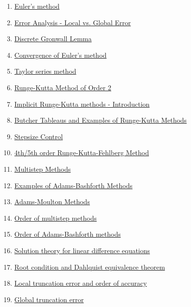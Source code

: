 \documentclass[11pt]{article}
\begin{document}
\begin{enumerate}
	\item \href{https://mp.weixin.qq.com/s/kYF-Ceohfhhii9OZVoskRQ}{Euler's method}	%
	\item \href{https://mp.weixin.qq.com/s/NOlZQwAl7e28JQ4aR_zigg}{Error Analysis - Local vs. Global Error}	%
	\item \href{https://mp.weixin.qq.com/s/ldqy32nC6bWUUHdd9i_ykA}{Discrete Gronwall Lemma}	%
	\item \href{https://mp.weixin.qq.com/s/iCCQx7UkC992DXQa-XiBig}{Convergence of Euler's method}	%
	\item \href{https://mp.weixin.qq.com/s/E7tK_shf3mFskTIXi7Zg2w}{Taylor series method}	%
	\item \href{https://mp.weixin.qq.com/s/g-EztkOwAAf5kmZgO2INfw}{Runge-Kutta Method of Order 2}	%
	\item \href{https://mp.weixin.qq.com/s/1s8sd0VurrrkHNtOFeu2wA}{Implicit Runge-Kutta methods - Introduction}	%
	\item \href{https://mp.weixin.qq.com/s/51UG3JpMITQzV94fJ4AFJg}{Butcher Tableaus and Examples of Runge-Kutta Methods}	%
	\item \href{https://mp.weixin.qq.com/s/FhHv6yyWZLPv2joYe6CUFQ}{Stepsize Control}	%
	\item \href{https://mp.weixin.qq.com/s/fpSfs0N2BFNOJwawb7AK0g}{4th/5th order Runge-Kutta-Fehlberg Method}	%
	\item \href{https://mp.weixin.qq.com/s/xSNMBn_vFWct-2rO4FJmbw}{Multistep Methods}	%
	\item \href{https://mp.weixin.qq.com/s/IXb1LbYIDzlEGEY0xV21rg}{Examples of Adams-Bashforth Methods}	%
	\item \href{https://mp.weixin.qq.com/s/yOUnANDNga_jZC6JGKykng}{Adams-Moulton Methods}	%
	\item \href{https://mp.weixin.qq.com/s/6T_aX__VVZUFdfnjt7kqMg}{Order of multistep methods}	%
	\item \href{https://mp.weixin.qq.com/s/YZxBNqKoqBlLVmgUB3jlew}{Order of Adams-Bashforth methods}	%
	\item \href{https://mp.weixin.qq.com/s/o21ZhkSsx8NhNEi7ZaWngw}{Solution theory for linear difference equations}	%
	\item \href{https://mp.weixin.qq.com/s/G2RqZI2e1gKdzroMh-rF4A}{Root condition and Dahlquist equivalence theorem}	%
	\item \href{https://mp.weixin.qq.com/s/w_8_pekvhyKbU_naKLz9vg}{Local truncation error and order of accuracy}	%
	\item \href{https://mp.weixin.qq.com/s/lKRhIpREiAb5YE8lyje3aw}{Global truncation error}	%

\end{enumerate}
\end{document}
